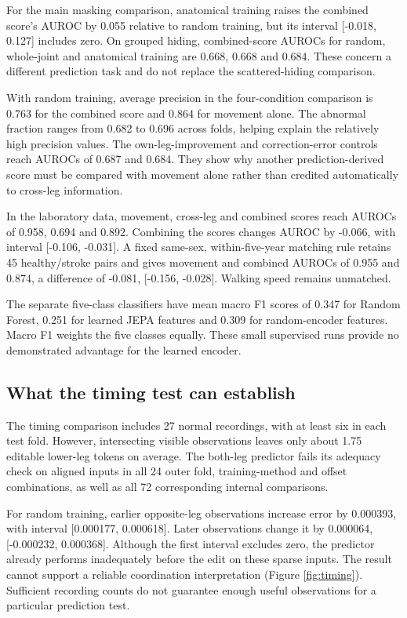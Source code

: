 \documentclass[letterpaper]{article}
\begin{document}
For the main masking comparison, anatomical training raises the combined score's AUROC by 0.055 relative to random training, but its interval {[}-0.018, 0.127{]} includes zero. On grouped hiding, combined-score AUROCs for random, whole-joint and anatomical training are 0.668, 0.668 and 0.684. These concern a different prediction task and do not replace the scattered-hiding comparison.

With random training, average precision in the four-condition comparison is 0.763 for the combined score and 0.864 for movement alone. The abnormal fraction ranges from 0.682 to 0.696 across folds, helping explain the relatively high precision values. The own-leg-improvement and correction-error controls reach AUROCs of 0.687 and 0.684. They show why another prediction-derived score must be compared with movement alone rather than credited automatically to cross-leg information.

In the laboratory data, movement, cross-leg and combined scores reach AUROCs of 0.958, 0.694 and 0.892. Combining the scores changes AUROC by -0.066, with interval {[}-0.106, -0.031{]}. A fixed same-sex, within-five-year matching rule retains 45 healthy/stroke pairs and gives movement and combined AUROCs of 0.955 and 0.874, a difference of -0.081, {[}-0.156, -0.028{]}. Walking speed remains unmatched.

The separate five-class classifiers have mean macro F1 scores of 0.347 for Random Forest, 0.251 for learned JEPA features and 0.309 for random-encoder features. Macro F1 weights the five classes equally. These small supervised runs provide no demonstrated advantage for the learned encoder.

\subsection{What the timing test can establish}

The timing comparison includes 27 normal recordings, with at least six in each test fold. However, intersecting visible observations leaves only about 1.75 editable lower-leg tokens on average. The both-leg predictor fails its adequacy check on aligned inputs in all 24 outer fold, training-method and offset combinations, as well as all 72 corresponding internal comparisons.

For random training, earlier opposite-leg observations increase error by 0.000393, with interval {[}0.000177, 0.000618{]}. Later observations change it by 0.000064, {[}-0.000232, 0.000368{]}. Although the first interval excludes zero, the predictor already performs inadequately before the edit on these sparse inputs. The result cannot support a reliable coordination interpretation (Figure \ref{fig:timing}). Sufficient recording counts do not guarantee enough useful observations for a particular prediction test.
\end{document}
